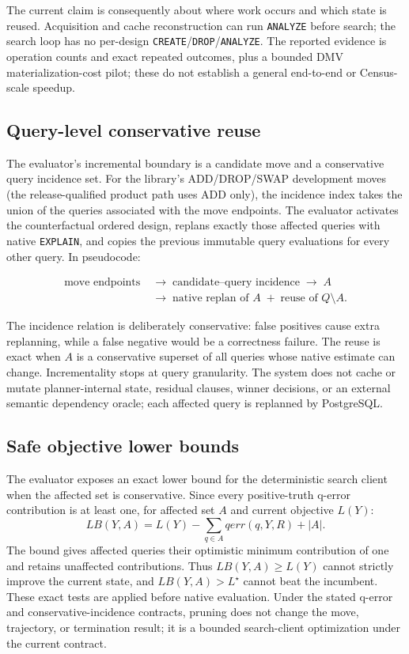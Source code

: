 The current claim is consequently about where work occurs and which state is
reused.  Acquisition and cache reconstruction can run \texttt{ANALYZE} before
search; the search loop has no per-design
\texttt{CREATE}/\texttt{DROP}/\texttt{ANALYZE}.  The reported evidence is
operation counts and exact repeated outcomes, plus a bounded DMV
materialization-cost pilot; these do not establish a general end-to-end or
Census-scale speedup.

\subsection{Query-level conservative reuse}

The evaluator's incremental boundary is a candidate move and a conservative
query incidence set.  For the library's ADD/DROP/SWAP development moves (the
release-qualified product path uses ADD only), the incidence index takes the
union of the queries associated with the move endpoints.  The evaluator
activates the counterfactual ordered design, replans exactly those affected
queries with native \texttt{EXPLAIN}, and copies the previous immutable query
evaluations for every other query.  In pseudocode:

\[
\begin{aligned}
 \text{move endpoints}
 &\;\rightarrow\; \text{candidate--query incidence}
 \;\rightarrow\; A \\
 &\;\rightarrow\; \text{native replan of }A
 \;+\; \text{reuse of }Q\setminus A.
\end{aligned}
\]

The incidence relation is deliberately conservative: false positives cause
extra replanning, while a false negative would be a correctness failure.  The
reuse is exact when $A$ is a conservative superset of all queries whose
native estimate can change.  Incrementality stops at query granularity.  The
system does not cache or mutate planner-internal state, residual clauses,
winner decisions, or an external semantic dependency oracle; each affected
query is replanned by PostgreSQL.

\subsection{Safe objective lower bounds}

The evaluator exposes an exact lower bound for the deterministic search client
when the affected set is conservative.  Since every positive-truth q-error
contribution is at least one, for affected set $A$ and current objective
$L(Y)$:
\[
 LB(Y,A)=L(Y)-\sum_{q\in A}qerr(q,Y,R)+|A|.
\]
The bound gives affected queries their optimistic minimum contribution of one
and retains unaffected contributions.  Thus $LB(Y,A)\ge L(Y)$ cannot strictly
improve the current state, and $LB(Y,A)>L^\star$ cannot beat the incumbent.
These exact tests are applied before native evaluation.  Under the stated
q-error and conservative-incidence contracts, pruning does not change the
move, trajectory, or termination result; it is a bounded search-client
optimization under the current contract.

